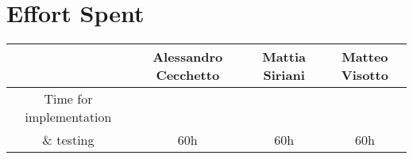 \section{Effort Spent}
\begin{table}[h!]
    \centering
    \begin{tabular}{c||c|c|c}
     & Alessandro Cecchetto & Mattia Siriani & Matteo Visotto \\ \hline \hline
     
        Time for implementation &  &  & \\ \& testing & 60h & 60h & 60h \\ \hline 

    \end{tabular}
\end{table}